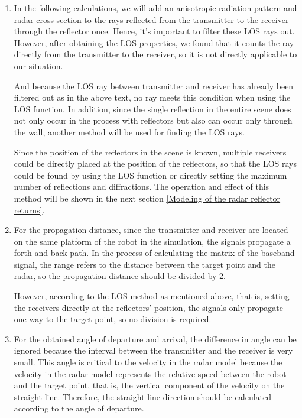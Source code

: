 \documentclass[12pt,DIV14,BCOR12mm,a4paper,footinclude=false,headinclude,parskip=half-,twoside,openright,cleardoublepage=empty,toc=index,bibliography=totoc,listof=totoc]{scrreprt}
\numberwithin{equation}{chapter}
\begin{document}
\begin{enumerate}[label=\textbullet]
    \item In the following calculations, we will add an anisotropic radiation pattern and radar cross-section to the rays reflected from the transmitter to the receiver through the reflector once. Hence, it's important to filter these LOS rays out. However, after obtaining the LOS properties, we found that it counts the ray directly from the transmitter to the receiver, so it is not directly applicable to our situation.

    And because the LOS ray between transmitter and receiver has already been filtered out as in the above text, no ray meets this condition when using the LOS function. In addition, since the single reflection in the entire scene does not only occur in the process with reflectors but also can occur only through the wall, another method will be used for finding the LOS rays.

    Since the position of the reflectors in the scene is known, multiple receivers could be directly placed at the position of the reflectors, so that the LOS rays could be found by using the LOS function \cite{los_function} or directly setting the maximum number of reflections and diffractions. The operation and effect of this method will be shown in the next section \ref{Modeling of the radar reflector returns}.

    \item For the propagation distance, since the transmitter and receiver are located on the same platform of the robot in the simulation, the signals propagate a forth-and-back path. In the process of calculating the matrix of the baseband signal, the range refers to the distance between the target point and the radar, so the propagation distance should be divided by 2.

    However, according to the LOS method as mentioned above, that is, setting the receivers directly at the reflectors' position, the signals only propagate one way to the target point, so no division is required.

    \item For the obtained angle of departure and arrival, the difference in angle can be ignored because the interval between the transmitter and the receiver is very small. This angle is critical to the velocity in the radar model because the velocity in the radar model represents the relative speed between the robot and the target point, that is, the vertical component of the velocity on the straight-line. Therefore, the straight-line direction should be calculated according to the angle of departure.


\end{enumerate}
\end{document}
